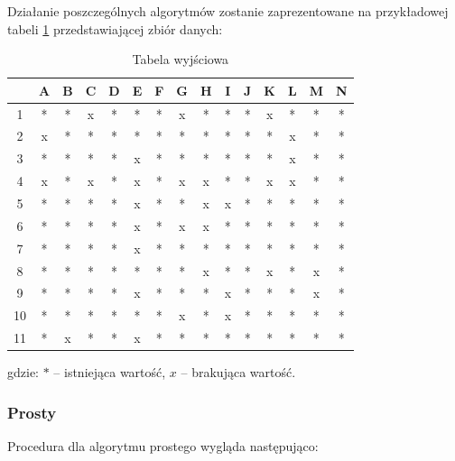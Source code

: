 \documentclass[12pt,twoside]{article}
\begin{document}
Działanie poszczególnych algorytmów zostanie zaprezentowane na przykładowej tabeli \ref{tab:base}
przedstawiającej zbiór danych:
\begin{table}[ht]
\caption{Tabela wyjściowa}
\centering
    \begin{tabular}{|c|c|c|c|c|c|c|c|c|c|c|c|c|c|c|}
        \hline
           & A & B & C & D & E & F & G & H & I & J & K & L & M & N \\ \hline
        1  & * & * & x & * & * & * & x & * & * & * & x & * & * & * \\ \hline
        2  & x & * & * & * & * & * & * & * & * & * & * & x & * & * \\ \hline
        3  & * & * & * & * & x & * & * & * & * & * & * & x & * & * \\ \hline
        4  & x & * & x & * & x & * & x & x & * & * & x & x & * & * \\ \hline
        5  & * & * & * & * & x & * & * & x & x & * & * & * & * & * \\ \hline
        6  & * & * & * & * & x & * & x & x & * & * & * & * & * & * \\ \hline
        7  & * & * & * & * & x & * & * & * & * & * & * & * & * & * \\ \hline
        8  & * & * & * & * & * & * & * & x & * & * & x & * & x & * \\ \hline
        9  & * & * & * & * & x & * & * & * & x & * & * & * & x & * \\ \hline
        10 & * & * & * & * & * & * & x & * & x & * & * & * & * & * \\ \hline
        11 & * & x & * & * & x & * & * & * & * & * & * & * & * & * \\ \hline
    \end{tabular}
\label{tab:base}
\end{table}
\FloatBarrier
gdzie: $*$ -- istniejąca wartość, $x$ -- brakująca wartość.

\subsubsection{Prosty}

Procedura dla algorytmu prostego wygląda następująco:
\end{document}
